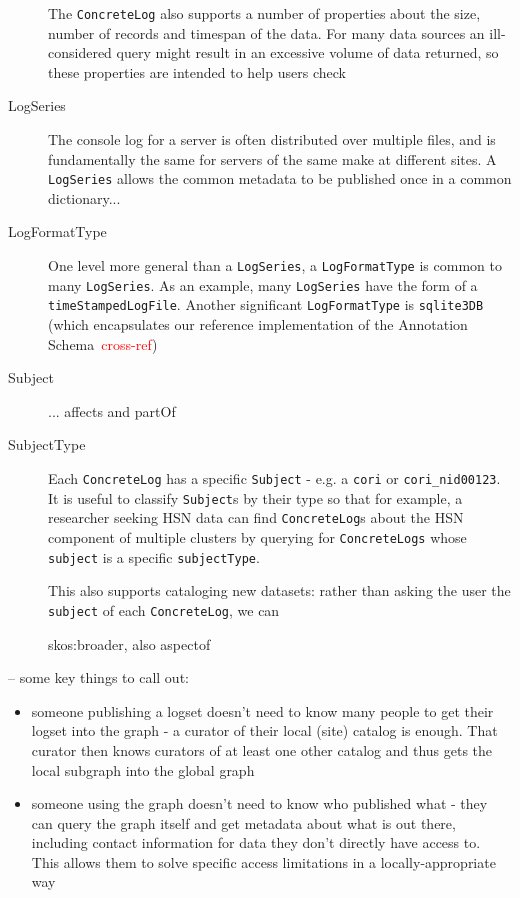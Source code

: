\begin{description}
The \texttt{ConcreteLog} also supports a number of properties about the
size, number of records and timespan of the data. For many data sources 
an ill-considered query might result in an excessive volume of data returned,
so these properties are intended to help users check 


\item[LogSeries] \hfill

The console log for a server is often distributed over multiple files,
and is fundamentally the same for servers of the same make at different
sites. A \texttt{LogSeries} allows the common metadata to be published
once in a common dictionary...


\item[LogFormatType]

One level more general than a \texttt{LogSeries}, a \texttt{LogFormatType}
is common to many \texttt{LogSeries}. As an example, many \texttt{LogSeries}
have the form of a \texttt{timeStampedLogFile}. Another significant 
\texttt{LogFormatType} is \texttt{sqlite3DB} (which encapsulates our 
reference implementation of the Annotation Schema~\textcolor{red}{cross-ref})

\item[Subject]
...
affects and partOf



\item[SubjectType]

Each \texttt{ConcreteLog} has a specific \texttt{Subject} - e.g. a 
\texttt{cori} or \texttt{cori\_nid00123}. It is useful to classify 
\texttt{Subject}s by their type so that for example, a researcher 
seeking HSN data can find \texttt{ConcreteLog}s about the HSN 
component of multiple clusters by querying for \texttt{ConcreteLogs}
whose \texttt{subject} is a specific \texttt{subjectType}. 

This also supports cataloging new datasets: rather than asking the
user the \texttt{subject} of each \texttt{ConcreteLog}, we can 

skos:broader, also aspectof


\end{description}

-- some key things to call out:
\begin{itemize}
\item someone publishing a logset doesn't need to know many people to get their 
      logset into the graph - a curator of their local (site) catalog is enough. 
      That curator then knows curators of at least one other catalog and thus 
      gets the local 
      subgraph into the global graph
\item someone using the graph doesn't need to know who published what - they can
      query the graph itself and get metadata about what is out there, including contact 
      information for data they don't directly have access to. This allows them to 
      solve specific access limitations in a locally-appropriate way
\end{itemize}

